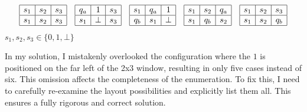 \documentclass[12pt, letterpaper]{article}
\begin{document}
\color{\TextColor}
\pagecolor{\colormode}
\setlength{\parindent}{0pt}
\pagestyle{fancy}
\fancyhf{}
\fancyhead[ROE]{\color{\TextColor}\thepage}

\begin{solution}
    \[
        \begin{array}{|c|c|c|}
          \hline
          s_1 & s_2 & s_3 \\
          \hline
          s_1 & s_2 & s_3 \\
          \hline
        \end{array}
        \quad
        \begin{array}{|c|c|c|}
            \hline
            q_a & 1 & s_3 \\
            \hline
            s_1 & \bot & s_3 \\
            \hline
        \end{array}
        \quad
        \begin{array}{|c|c|c|}
              \hline
              s_1 & q_a & 1 \\
              \hline
              q_b & s_1 & \bot \\
              \hline
        \end{array}
        \quad
        \begin{array}{|c|c|c|}
            \hline
            s_1 & s_2 & q_a \\
            \hline
            s_1 & q_b & s_2 \\
            \hline
        \end{array}
        \quad
        \begin{array}{|c|c|c|}
            \hline
            s_1 & s_2 & s_3 \\
            \hline
            s_1 & s_2 & q_b \\
            \hline
        \end{array}
      \]
      $s_1,s_2,s_3 \in \{0,1,\bot\}$

    \noindent In my solution, I mistakenly overlooked the configuration where the $1$ is positioned on the far left of the 2x3 window, resulting in only five cases instead of six. This omission affects the completeness of the enumeration. To fix this, I need to carefully re-examine the layout possibilities and explicitly list them all. This ensures a fully rigorous and correct solution.
\end{solution}
\end{document}
